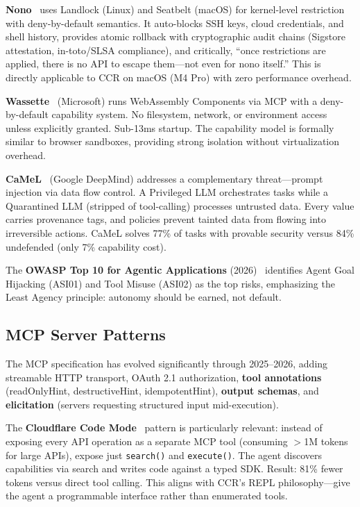 \documentclass[11pt]{article}
\begin{document}
\textbf{Nono}~\cite{nono} uses Landlock (Linux) and Seatbelt (macOS) for kernel-level restriction with deny-by-default semantics. It auto-blocks SSH keys, cloud credentials, and shell history, provides atomic rollback with cryptographic audit chains (Sigstore attestation, in-toto/SLSA compliance), and critically, ``once restrictions are applied, there is no API to escape them---not even for nono itself.'' This is directly applicable to CCR on macOS (M4 Pro) with zero performance overhead.

\textbf{Wassette}~\cite{wassette} (Microsoft) runs WebAssembly Components via MCP with a deny-by-default capability system. No filesystem, network, or environment access unless explicitly granted. Sub-13ms startup. The capability model is formally similar to browser sandboxes, providing strong isolation without virtualization overhead.

\textbf{CaMeL}~\cite{camel} (Google DeepMind) addresses a complementary threat---prompt injection via data flow control. A Privileged LLM orchestrates tasks while a Quarantined LLM (stripped of tool-calling) processes untrusted data. Every value carries provenance tags, and policies prevent tainted data from flowing into irreversible actions. CaMeL solves 77\% of tasks with provable security versus 84\% undefended (only 7\% capability cost).

The \textbf{OWASP Top 10 for Agentic Applications} (2026)~\cite{owasp_agentic} identifies Agent Goal Hijacking (ASI01) and Tool Misuse (ASI02) as the top risks, emphasizing the Least Agency principle: autonomy should be earned, not default.

\subsection{MCP Server Patterns}

The MCP specification has evolved significantly through 2025--2026, adding streamable HTTP transport, OAuth 2.1 authorization, \textbf{tool annotations} (readOnlyHint, destructiveHint, idempotentHint), \textbf{output schemas}, and \textbf{elicitation} (servers requesting structured input mid-execution).

The \textbf{Cloudflare Code Mode}~\cite{cloudflare_code_mode} pattern is particularly relevant: instead of exposing every API operation as a separate MCP tool (consuming $>$1M tokens for large APIs), expose just \texttt{search()} and \texttt{execute()}. The agent discovers capabilities via search and writes code against a typed SDK. Result: 81\% fewer tokens versus direct tool calling. This aligns with CCR's REPL philosophy---give the agent a programmable interface rather than enumerated tools.
\end{document}
